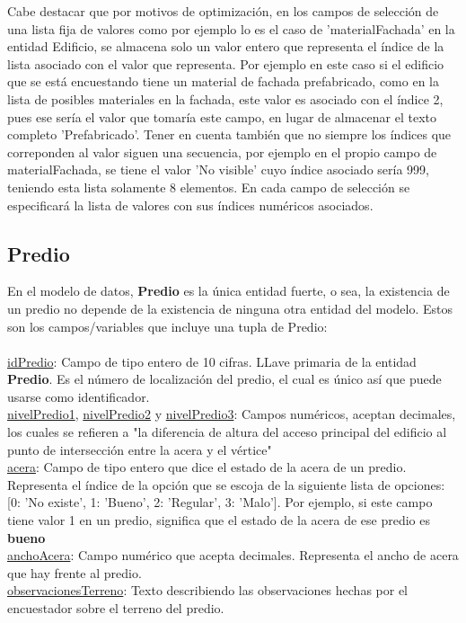 Cabe destacar que por motivos de optimización, en los campos de selección de una lista fija de valores como por ejemplo lo es el caso de 'materialFachada' en la entidad Edificio, se almacena solo un valor entero que representa el índice de
la lista asociado con el valor que representa. Por ejemplo en este caso si el edificio que se está encuestando tiene un material de fachada prefabricado, como en la lista de posibles materiales en la fachada, este valor es asociado con el índice 2,
pues ese sería el valor que tomaría este campo, en lugar de almacenar el texto completo 'Prefabricado'. Tener en cuenta también que no siempre los índices que correponden al valor siguen una secuencia, por ejemplo en el propio campo de materialFachada,
se tiene el valor 'No visible' cuyo índice asociado sería 999, teniendo esta lista solamente 8 elementos. En cada campo de selección se especificará la lista de valores con sus índices numéricos asociados.
\subsection{Predio}
En el modelo de datos, \textbf{Predio} es la única entidad fuerte, o sea, la existencia de un predio no depende de la existencia de ninguna otra entidad del modelo. Estos son los campos/variables que incluye una tupla de Predio:\\\\
\underline{idPredio}: Campo de tipo entero de 10 cifras. LLave primaria de la entidad \textbf{Predio}. Es el número de localización del predio, el cual es único así que puede usarse como identificador.\\
\underline{nivelPredio1}, \underline{nivelPredio2} y \underline{nivelPredio3}: Campos numéricos, aceptan decimales, los cuales se refieren a "la
diferencia de altura del acceso principal del edificio al punto de intersección entre la acera y el vértice"\\
\underline{acera}: Campo de tipo entero que dice el estado de la acera de un predio. Representa el índice de la opción que se escoja de la siguiente lista de opciones: [0: 'No existe', 1: 'Bueno', 2: 'Regular', 3: 'Malo']. Por ejemplo,
si este campo tiene valor 1 en un predio, significa que el estado de la acera de ese predio es \textbf{bueno}\\
\underline{anchoAcera}: Campo numérico que acepta decimales. Representa el ancho de acera que hay frente al predio.\\
\underline{observacionesTerreno}: Texto describiendo las observaciones hechas por el encuestador sobre el terreno del predio.\\\\
